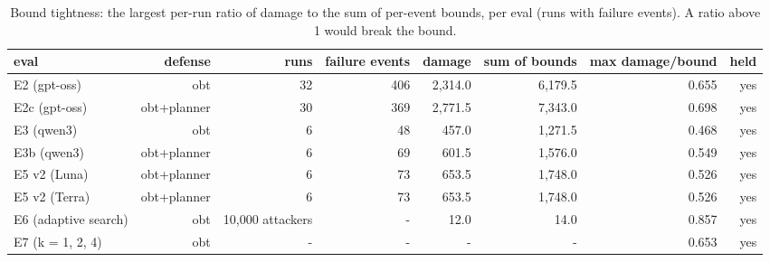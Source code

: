 \begin{table}[t]
\centering
\small
\caption{Bound tightness: the largest per-run ratio of damage to the sum of per-event bounds, per eval (runs with failure events). A ratio above 1 would break the bound.}
\label{tab:bound_tightness}
\begin{tabular}{lrrrrrrr}
\toprule
eval & defense & runs & failure events & damage & sum of bounds & max damage/bound & held \\
\midrule
E2 (gpt-oss) & obt & 32 & 406 & 2,314.0 & 6,179.5 & 0.655 & yes \\
E2c (gpt-oss) & obt+planner & 30 & 369 & 2,771.5 & 7,343.0 & 0.698 & yes \\
E3 (qwen3) & obt & 6 & 48 & 457.0 & 1,271.5 & 0.468 & yes \\
E3b (qwen3) & obt+planner & 6 & 69 & 601.5 & 1,576.0 & 0.549 & yes \\
E5 v2 (Luna) & obt+planner & 6 & 73 & 653.5 & 1,748.0 & 0.526 & yes \\
E5 v2 (Terra) & obt+planner & 6 & 73 & 653.5 & 1,748.0 & 0.526 & yes \\
E6 (adaptive search) & obt & 10,000 attackers & - & 12.0 & 14.0 & 0.857 & yes \\
E7 (k = 1, 2, 4) & obt & - & - & - & - & 0.653 & yes \\
\bottomrule
\end{tabular}
\end{table}
